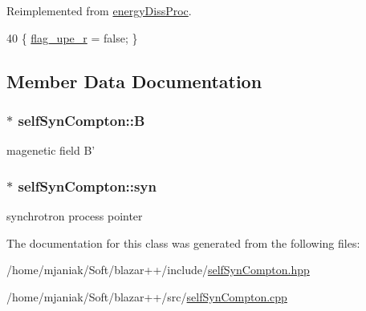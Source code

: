 Reimplemented from \hyperlink{classenergyDissProc_a6033524ea3d0fe38056bd74622f6c4ad}{energy\-Diss\-Proc}.


\begin{DoxyCode}
40 \{ \hyperlink{classenergyDissProc_a7b51925f603e271657cab66afe822591}{flag\_upe\_r} = \textcolor{keyword}{false}; \}
\end{DoxyCode}


\subsection{Member Data Documentation}
\hypertarget{classselfSynCompton_a7f24c41ccf47e77fefab4c946e9397f6}{
\subsubsection[{B}]{$\ast$ self\-Syn\-Compton\-::\-B}}\label{classselfSynCompton_a7f24c41ccf47e77fefab4c946e9397f6}
magenetic field B' \hypertarget{classselfSynCompton_a98b1421fe0ab8028d180d16d48ccbcc8}{
\subsubsection[{syn}]{$\ast$ self\-Syn\-Compton\-::syn}}\label{classselfSynCompton_a98b1421fe0ab8028d180d16d48ccbcc8}
synchrotron process pointer 

The documentation for this class was generated from the following files\-:\begin{DoxyCompactItemize}
\item 
/home/mjaniak/\-Soft/blazar++/include/\hyperlink{selfSynCompton_8hpp}{self\-Syn\-Compton.\-hpp}\item 
/home/mjaniak/\-Soft/blazar++/src/\hyperlink{selfSynCompton_8cpp}{self\-Syn\-Compton.\-cpp}\end{DoxyCompactItemize}
